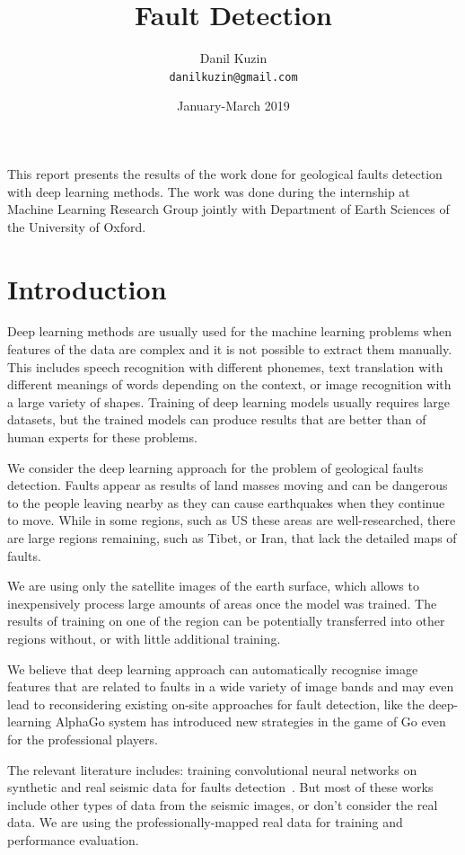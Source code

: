 \documentclass[11pt,a4paper]{article}
\begin{document}
\title{Fault Detection}
\author{Danil Kuzin \\ \texttt{danilkuzin@gmail.com}}
\date{January-March 2019}
\maketitle

\abstract
This report presents the results of the work done for geological faults detection with deep learning methods. The work was done during the internship at Machine Learning Research Group jointly with Department of Earth Sciences of the University of Oxford.

\section{Introduction}
Deep learning methods are usually used for the machine learning problems when features of the data are complex and it
is not possible to extract them manually. This includes speech recognition with different phonemes, text translation
with different meanings of words depending on the context, or image recognition with a large variety of shapes. Training
of deep learning models usually requires large datasets, but the trained models can produce results that are better than
of human experts for these problems.

We consider the deep learning approach for the problem of geological faults detection. Faults appear as results of
land masses moving and can be dangerous to the people leaving nearby as they can cause earthquakes when they continue to
move. While in some regions, such as US these areas are well-researched, there are large regions remaining, such as Tibet,
or Iran, that lack the detailed maps of faults.

We are using only the satellite images of the earth surface, which allows to inexpensively process large amounts of areas
once the model was trained. The results of training on one of the region can be potentially transferred into other regions
without, or with little additional training.

We believe that deep learning approach can automatically recognise image features that are related to faults in a wide
variety of image bands and may even lead to reconsidering existing on-site approaches for fault detection, like the
deep-learning AlphaGo system has introduced new strategies in the game of Go even for the professional players.

The relevant literature includes: training convolutional neural networks on synthetic and real seismic data for faults
detection~\cite{pochet2018seismic, araya2017automated, xiong2018seismic, chehrazi2013seismic, lu2018using, hale2014}.
But most of these works include other types of data from the seismic images, or don't consider the real data. We are using the
professionally-mapped real data for training and performance evaluation.
\end{document}
